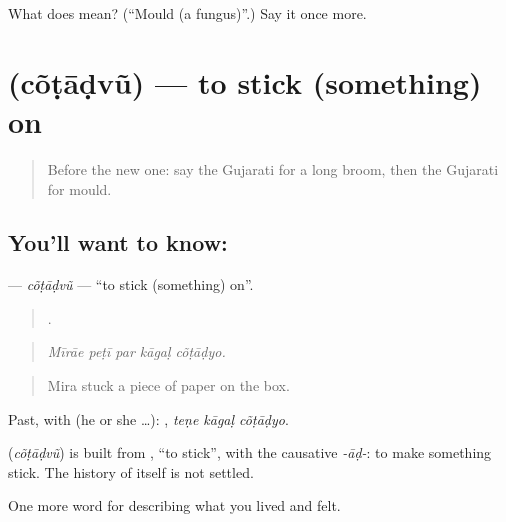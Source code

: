 \begin{tcolorbox}[breakable,colback=teal!4,colframe=teal!35!black,title={Before you move on}]
What does  mean? (\textquotedblleft{}Mould (a fungus)\textquotedblright{}.) Say it once more.
\end{tcolorbox}
\section[\texorpdfstring{\gu{ચોંટાડવું} (cõṭāḍvũ)}{ચોંટાડવું (cõṭāḍvũ)}]{ (cõṭāḍvũ) — to stick (something) on}

\label{lesson:GU-C518-cotadvu}



\begin{quote}
Before the new one: say the Gujarati for a long broom, then the Gujarati for mould.
\end{quote}

\subsection*{You'll want to know: }
\textbf{} — \emph{cõṭāḍvũ} — \textquotedblleft{}to stick (something) on\textquotedblright{}.

\begin{quote}
    .
\end{quote}

\begin{quote}
\emph{Mīrāe peṭī par kāgaḷ cõṭāḍyo.}
\end{quote}

\begin{quote}
Mira stuck a piece of paper on the box.
\end{quote}

Past, with  (he or she …):   , \emph{teṇe kāgaḷ cõṭāḍyo}.

\begin{cousinweb}
\textbf{} (\emph{cõṭāḍvũ}) is built from \textbf{}, \textquotedblleft{}to stick\textquotedblright{}, with the causative \emph{-āḍ-}: to make something stick. The history of \textbf{} itself is not settled.
\end{cousinweb}

\begin{grammarlens}[title={What you've built}]
One more word for describing what you lived and felt.
\end{grammarlens}


